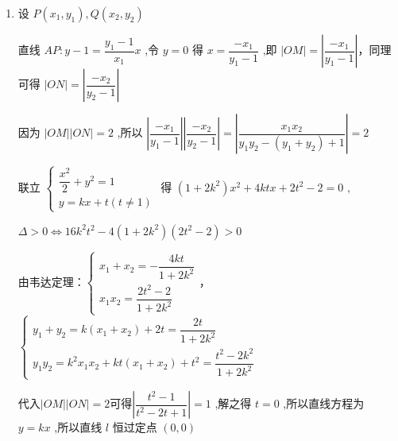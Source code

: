 \begin{enumerate}
\begin{jieda}
\begin{enumerate}
        因为椭圆经过点 $A\left( {0,1}\right)$ ,所以 $b = 1$ ,所以 ${a}^{2} = {b}^{2} + {c}^{2} = 2$ ,故椭圆的方程为 $\dfrac{{x}^{2}}{2} + {y}^{2} = 1$ .
        \item 设 $P\left( {{x}_{1},{y}_{1}}\right) ,Q\left( {{x}_{2},{y}_{2}}\right)$

        直线 ${AP} : y - 1 = \dfrac{{y}_{1} - 1}{{x}_{1}}x$ ,令 $y = 0$ 得 $x = \dfrac{-{x}_{1}}{{y}_{1} - 1}$ ,即 $\left| {OM}\right|  = \left| \dfrac{-{x}_{1}}{{y}_{1} - 1}\right|$，同理可得 $\left| {ON}\right|  = \left| \dfrac{-{x}_{2}}{{y}_{2} - 1}\right|$

        因为 $\left| {OM}\right| \left| {ON}\right|  = 2$ ,所以 $\left| \dfrac{-{x}_{1}}{{y}_{1} - 1}\right| \left| \dfrac{-{x}_{2}}{{y}_{2} - 1}\right|  = \left| \dfrac{{x}_{1}{x}_{2}}{{y}_{1}{y}_{2} - \left( {{y}_{1} + {y}_{2}}\right)  + 1}\right|  = 2$

        联立 $\left\{  \begin{matrix} \dfrac{{x}^{2}}{2} + {y}^{2} = 1 \\  y = {kx} + t\left( {t \neq  1}\right)  \end{matrix}\right.$ 得 $\left( {1 + 2{k}^{2}}\right) {x}^{2} + {4ktx} + 2{t}^{2} - 2 = 0$ ,

        $\Delta  > 0 \Longleftrightarrow 16k^2t^2-4(1+2k^2)(2t^2-2) > 0$
        
        由韦达定理：$\left\{\begin{array}{l}
                {x}_{1} + {x}_{2} =  - \dfrac{4kt}{1 + 2{k}^{2}}  \\
                {x}_{1}{x}_{2} = \dfrac{2{t}^{2} - 2}{1 + 2{k}^{2}}
        \end{array}\right.$，$\left\{\begin{array}{l}
                {y}_{1} + {y}_{2} = k\left( {{x}_{1} + {x}_{2}}\right)  + {2t} = \dfrac{2t}{1 + 2{k}^{2}} \\
                {y}_{1}{y}_{2} = {k}^{2}{x}_{1}{x}_{2} + {kt}\left( {{x}_{1} + {x}_{2}}\right)  + {t}^{2} = \dfrac{{t}^{2} - 2{k}^{2}}{1 + 2{k}^{2}}
        \end{array}\right.$

        代入$\left| {OM}\right| \left| {ON}\right|  = 2$可得$\left| \dfrac{{t}^{2} - 1}{{t}^{2} - {2t} + 1}\right|  = 1$ ,解之得 $t = 0$ ,所以直线方程为 $y = {kx}$ ,所以直线 $l$ 恒过定点 $\left( {0,0}\right)$ 
    \end{enumerate}
    \end{jieda}


\end{enumerate}
